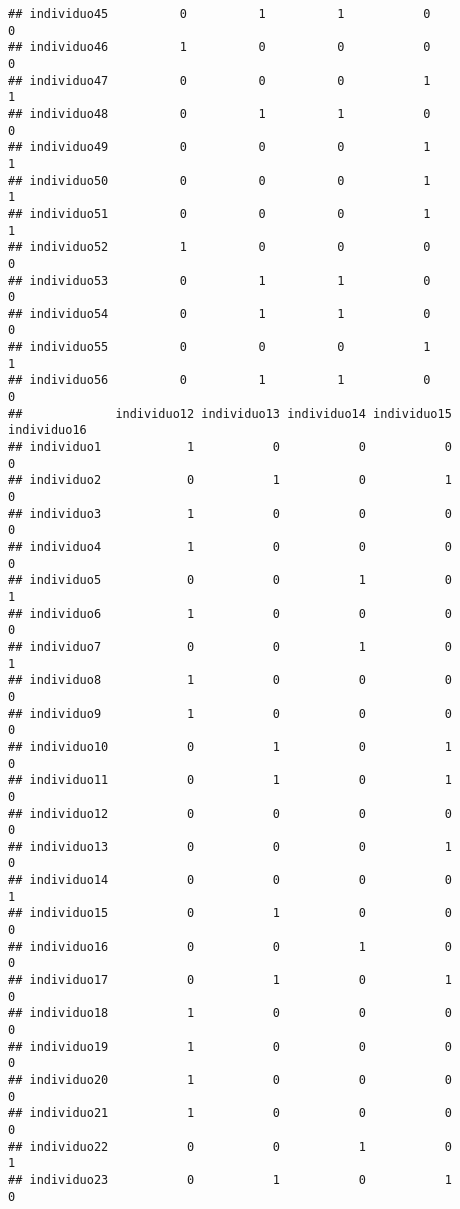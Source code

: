 \documentclass[
]{article}
\begin{document}
\begin{verbatim}
## individuo45          0          1          1           0           0
## individuo46          1          0          0           0           0
## individuo47          0          0          0           1           1
## individuo48          0          1          1           0           0
## individuo49          0          0          0           1           1
## individuo50          0          0          0           1           1
## individuo51          0          0          0           1           1
## individuo52          1          0          0           0           0
## individuo53          0          1          1           0           0
## individuo54          0          1          1           0           0
## individuo55          0          0          0           1           1
## individuo56          0          1          1           0           0
##             individuo12 individuo13 individuo14 individuo15 individuo16
## individuo1            1           0           0           0           0
## individuo2            0           1           0           1           0
## individuo3            1           0           0           0           0
## individuo4            1           0           0           0           0
## individuo5            0           0           1           0           1
## individuo6            1           0           0           0           0
## individuo7            0           0           1           0           1
## individuo8            1           0           0           0           0
## individuo9            1           0           0           0           0
## individuo10           0           1           0           1           0
## individuo11           0           1           0           1           0
## individuo12           0           0           0           0           0
## individuo13           0           0           0           1           0
## individuo14           0           0           0           0           1
## individuo15           0           1           0           0           0
## individuo16           0           0           1           0           0
## individuo17           0           1           0           1           0
## individuo18           1           0           0           0           0
## individuo19           1           0           0           0           0
## individuo20           1           0           0           0           0
## individuo21           1           0           0           0           0
## individuo22           0           0           1           0           1
## individuo23           0           1           0           1           0

\end{verbatim}
\end{document}
